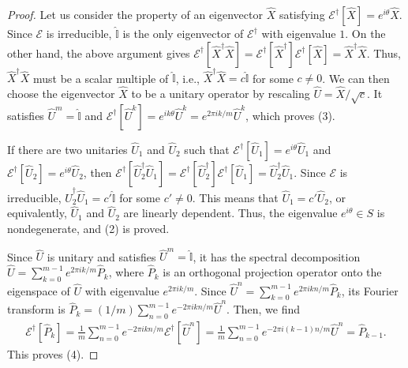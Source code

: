 \documentclass[preprint,pteplogo]{ptephy_v2}%
\numberwithin{equation}{section}
\theoremstyle{definition}
\newcommand{\mc}[1]{\mathcal{#1}}
\newcommand{\mbb}[1]{\mathbb{#1}}
\begin{document}
\begin{proof}
Let us consider the property of an eigenvector $\hat{X}$ satisfying $\mc{E}^\dagger[\hat{X}] = e^{i\theta} \hat{X}$.
Since $\mc{E}$ is irreducible, $\hat{\mbb{I}}$ is the only eigenvector of $\mc{E}^\dagger$ with eigenvalue $1$.
On the other hand, the above argument gives $\mc{E}^\dagger[\hat{X}^\dagger \hat{X}] = \mc{E}^\dagger[\hat{X}^\dagger] \mc{E}^\dagger[\hat{X}] = \hat{X}^\dagger \hat{X}$.
Thus, $\hat{X}^\dagger \hat{X}$ must be a scalar multiple of $\hat{\mbb{I}}$, i.e., $\hat{X}^\dagger \hat{X} = c \hat{\mbb{I}}$ for some $c \neq 0$.
We can then choose the eigenvector $\hat{X}$ to be a unitary operator by rescaling $\hat{U}=\hat{X}/\sqrt{c}$.
It satisfies $\hat{U}^m = \hat{\mbb{I}}$ and $\mc{E}^\dagger[\hat{U}^k] = e^{ik\theta} \hat{U}^k = e^{2\pi ik/m} \hat{U}^k$, which proves (3).

If there are two unitaries $\hat{U}_1$ and $\hat{U}_2$ such that $\mc{E}^\dagger[\hat{U}_1] = e^{i\theta} \hat{U}_1$ and $\mc{E}^\dagger[\hat{U}_2] = e^{i\theta} \hat{U}_2$, then $\mc{E}^\dagger[\hat{U}_2^\dagger \hat{U}_1] = \mc{E}^\dagger[\hat{U}_2^\dagger] \mc{E}^\dagger[\hat{U}_1] = \hat{U}_2^\dagger \hat{U}_1$. 
Since $\mc{E}$ is irreducible, $\hat{U}_2^\dagger \hat{U}_1 = c' \hat{\mbb{I}}$ for some $c' \neq 0$.
This means that $\hat{U}_1 = c' \hat{U}_2$, or equivalently, $\hat{U}_1$ and $\hat{U}_2$ are linearly dependent. 
Thus, the eigenvalue $e^{i\theta} \in S$ is nondegenerate, and (2) is proved.

Since $\hat{U}$ is unitary and satisfies $\hat{U}^m = \hat{\mbb{I}}$, it has the spectral decomposition $\hat{U} = \sum_{k=0}^{m-1} e^{2\pi ik/m} \hat{P}_k$, where $\hat{P}_k$ is an orthogonal projection operator onto the eigenspace of $\hat{U}$ with eigenvalue $e^{2\pi ik/m}$.
Since $\hat{U}^n = \sum_{k=0}^{m-1} e^{2\pi ikn/m} \hat{P}_k$, its Fourier transform is $\hat{P}_k = (1/m) \sum_{n=0}^{m-1} e^{-2\pi ikn/m} \hat{U}^n$.
Then, we find
\begin{align}
\mc{E}^\dagger[\hat{P}_k] 
= \frac{1}{m} \sum_{n=0}^{m-1} e^{-2\pi ikn/m} \mc{E}^\dagger [\hat{U}^n] 
= \frac{1}{m} \sum_{n=0}^{m-1} e^{-2\pi i(k-1)n/m} \hat{U}^n 
= \hat{P}_{k-1}.
\end{align}
This proves (4).
\end{proof}
\end{document}
